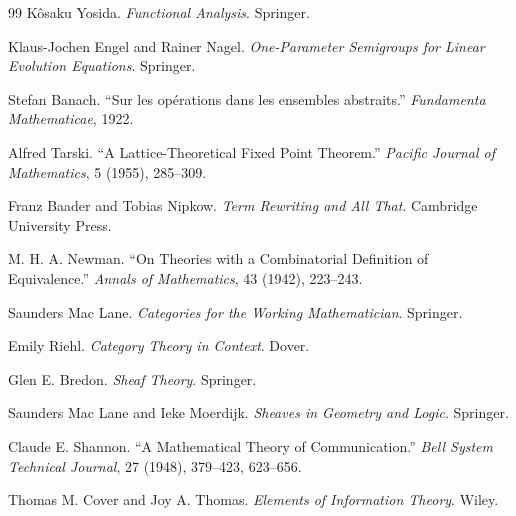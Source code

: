 \documentclass[11pt]{book}
\numberwithin{equation}{chapter}
\theoremstyle{definition}
\theoremstyle{plain}
\begin{document}
\begin{thebibliography}{99}
Kôsaku Yosida.
\textit{Functional Analysis}.
Springer.

Klaus-Jochen Engel and Rainer Nagel.
\textit{One-Parameter Semigroups for Linear Evolution Equations}.
Springer.


Stefan Banach.
``Sur les opérations dans les ensembles abstraits.''
\textit{Fundamenta Mathematicae},
1922.

Alfred Tarski.
``A Lattice-Theoretical Fixed Point Theorem.''
\textit{Pacific Journal of Mathematics},
5 (1955), 285--309.


Franz Baader and Tobias Nipkow.
\textit{Term Rewriting and All That}.
Cambridge University Press.

M. H. A. Newman.
``On Theories with a Combinatorial Definition of Equivalence.''
\textit{Annals of Mathematics},
43 (1942), 223--243.


Saunders Mac Lane.
\textit{Categories for the Working Mathematician}.
Springer.

Emily Riehl.
\textit{Category Theory in Context}.
Dover.


Glen E. Bredon.
\textit{Sheaf Theory}.
Springer.

Saunders Mac Lane and Ieke Moerdijk.
\textit{Sheaves in Geometry and Logic}.
Springer.


Claude E. Shannon.
``A Mathematical Theory of Communication.''
\textit{Bell System Technical Journal},
27 (1948), 379--423, 623--656.

Thomas M. Cover and Joy A. Thomas.
\textit{Elements of Information Theory}.
Wiley.


\end{thebibliography}
\end{document}

